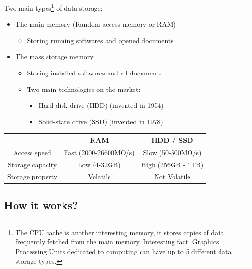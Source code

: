 \documentclass{beamer}[10pt, usepdftitle=false, handout]
\begin{document}
	\begin{frame}

	Two main types\footnote{The CPU cache is another interesting memory, it stores copies of data frequently fetched from the main memory. Interesting fact: Graphics Processing Units dedicated to computing can have up to 5 different data storage types.} of data storage:
	\begin{itemize}
	\item {The main memory (Random-access memory or RAM)
		\begin{itemize}
			\item {Storing running softwares and opened documents}	
		\end{itemize}			
	}
	\item {The mass storage memory 
		\begin{itemize}
			\item {Storing installed softwares and all documents}
			\item {Two main technologies on the market: 
				\begin{itemize}
					\item {Hard-disk drive (HDD) (invented in 1954)}
					\item {Solid-state drive (SSD) (invented in 1978)}
				\end{itemize}
			}
		\end{itemize}			
	}
	\end{itemize}
	
	\begin{center}
	\begin{tabular}{c | c | c }
		 & RAM & HDD / SSD \\ \hline
		Access speed & Fast (2000-26600MO/s) & Slow (50-500MO/s) \\
		Storage capacity & Low (4-32GB) & High (256GB - 1TB) \\
		Storage property & Volatile & Not Volatile 
	\end{tabular}
	\end{center}

	\end{frame}

	\subsection{How it works?}
\end{document}
